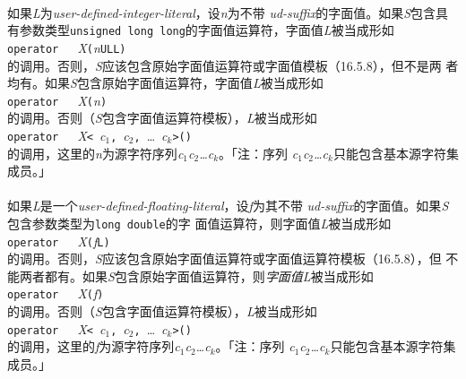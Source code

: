 \paragraph{}
如果\textit{L}为\textit{user-defined-integer-literal}，设\textit{n}为不带
\textit{ud-suffix}的字面值。如果\textit{S}包含具有参数类型\texttt{unsigned long
long}的字面值运算符，字面值\textit{L}被当成形如                               \\
\mbox{\qquad \texttt{operator \qdbl\qdbl}\ \
  \textit{X}\texttt{(}\textit{n}\texttt{ULL)}}                                \\
的调用。否则，\textit{S}应该包含原始字面值运算符或字面值模板（16.5.8），但不是两
者均有。如果\textit{S}包含原始字面值运算符，字面值\textit{L}被当成形如        \\
\mbox{\qquad \texttt{operator \qdbl\qdbl}\ \
  \textit{X}\texttt{(\qdbl}\textit{n}\texttt{\qdbl)}}                         \\
的调用。否则（\textit{S}包含字面值运算符模板），\textit{L}被当成形如          \\
\mbox{\qquad \texttt{operator \qdbl\qdbl}\ \ \textit{X}\texttt{<}
  \textit{\qsgl c$_1$\qsgl}\texttt{,} \textit{\qsgl c$_2$\qsgl}\texttt{,} \ldots
  \textit{\qsgl c$_k$\qsgl}\texttt{>()}}                                      \\
的调用，这里的\textit{n}为源字符序列\textit{c$_1$c$_2$\ldots c$_k$}。「注：序列
\textit{c$_1$c$_2$\ldots c$_k$}只能包含基本源字符集成员。」

\paragraph{}
如果\textit{L}是一个\textit{user-defined-floating-literal}，设\textit{f}为其不带
\textit{ud-suffix}的字面值。如果\textit{S}包含参数类型为\texttt{long double}的字
面值运算符，则字面值\textit{L}被当成形如                                      \\
\mbox{\qquad \texttt{operator \qdbl\qdbl}\ \
  \textit{X}\texttt{(}\textit{f}\texttt{L)}}                                  \\
的调用。否则，\textit{S}应该包含原始字面值运算符或字面值运算符模板（16.5.8），但
不能两者都有。如果\textit{S}包含原始字面值运算符，则\textit{字面值L}被当成形如\\
\mbox{\qquad \texttt{operator \qdbl\qdbl}\ \
  \textit{X}\texttt{(\qdbl}\textit{f}\texttt{\qdbl)}}                         \\
的调用。否则（\textit{S}包含字面值运算符模板），\textit{L}被当成形如          \\
\mbox{\qquad \texttt{operator \qdbl\qdbl}\ \ \textit{X}\texttt{<}
  \textit{\qsgl c$_1$\qsgl}\texttt{,} \textit{\qsgl c$_2$\qsgl}\texttt{,} \ldots
  \textit{\qsgl c$_k$\qsgl}\texttt{>()}}                                      \\
的调用，这里的\textit{f}为源字符序列\textit{c$_1$c$_2$\ldots c$_k$}。「注：序列
\textit{c$_1$c$_2$\ldots c$_k$}只能包含基本源字符集成员。」

